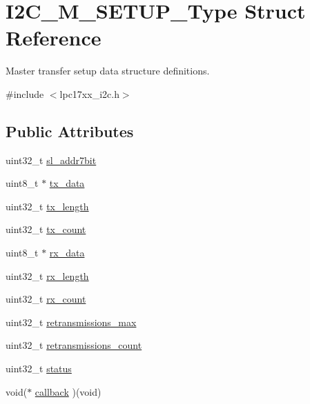 \hypertarget{struct_i2_c___m___s_e_t_u_p___type}{\section{\-I2\-C\-\_\-\-M\-\_\-\-S\-E\-T\-U\-P\-\_\-\-Type \-Struct \-Reference}
\label{struct_i2_c___m___s_e_t_u_p___type}
}


\-Master transfer setup data structure definitions.  




{\ttfamily \#include $<$lpc17xx\-\_\-i2c.\-h$>$}

\subsection*{\-Public \-Attributes}
\begin{DoxyCompactItemize}
\item 
uint32\-\_\-t \hyperlink{struct_i2_c___m___s_e_t_u_p___type_a369581824a6baea2ab236b32d3d51062}{sl\-\_\-addr7bit}
\item 
uint8\-\_\-t $\ast$ \hyperlink{struct_i2_c___m___s_e_t_u_p___type_a17bf43e1146272e6a06df8f5adda2e72}{tx\-\_\-data}
\item 
uint32\-\_\-t \hyperlink{struct_i2_c___m___s_e_t_u_p___type_af9632e0a6ac1ee550ec274c50e45af86}{tx\-\_\-length}
\item 
uint32\-\_\-t \hyperlink{struct_i2_c___m___s_e_t_u_p___type_a16c03240bb80a96c6568b3cbf740be94}{tx\-\_\-count}
\item 
uint8\-\_\-t $\ast$ \hyperlink{struct_i2_c___m___s_e_t_u_p___type_ad4ec2a23f5fb9d6896d8fb7549eb8a02}{rx\-\_\-data}
\item 
uint32\-\_\-t \hyperlink{struct_i2_c___m___s_e_t_u_p___type_a9bbc3df52a3571f128b818e38b9ce96f}{rx\-\_\-length}
\item 
uint32\-\_\-t \hyperlink{struct_i2_c___m___s_e_t_u_p___type_a64e0b05e44731d2c54ae082274db25d1}{rx\-\_\-count}
\item 
uint32\-\_\-t \hyperlink{struct_i2_c___m___s_e_t_u_p___type_aa670cdabc0355d818afc15c788db63bc}{retransmissions\-\_\-max}
\item 
uint32\-\_\-t \hyperlink{struct_i2_c___m___s_e_t_u_p___type_aa6840f872e22a72e9f916a490ecd1248}{retransmissions\-\_\-count}
\item 
uint32\-\_\-t \hyperlink{struct_i2_c___m___s_e_t_u_p___type_aee964d65fc6f579feedcd276b833777f}{status}
\item 
void($\ast$ \hyperlink{struct_i2_c___m___s_e_t_u_p___type_a24fc12477badd1015a6150f294883773}{callback} )(void)
\end{DoxyCompactItemize}



